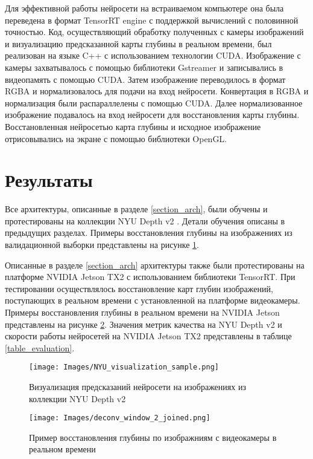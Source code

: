 \documentclass{mipt-thesis-bs}
\begin{document}
Для эффективной работы нейросети на встраиваемом компьютере она была переведена в формат TensorRT engine с поддержкой вычислений с половинной точностью. Код, осуществляющий обработку полученных с камеры изображений и визуализацию предсказанной карты глубины в реальном времени, был реализован на языке C++ с использованием технологии CUDA. Изображение с камеры захватывалось с помощью библиотеки Gstreamer и записывались в видеопамять с помощью CUDA. Затем изображение переводилось в формат RGBA и нормализовалось для подачи на вход нейросети. Конвертация в RGBA и нормализация были распараллелены с помощью CUDA. Далее нормализованное изображение подавалось на вход нейросети для восстановления карты глубины. Восстановленная нейросетью карта глубины и исходное изображение отрисовывались на экране с помощью библиотеки OpenGL.

\section{Результаты}
Все архитектуры, описанные в разделе \ref{section_arch}, были обучены и протестированы на коллекции NYU Depth v2 \cite{silberman2011indoor}. Детали обучения описаны в предыдущих разделах. Примеры восстановления глубины на изображениях из валидационной выборки представлены на рисунке \ref{figurevisualization}.

Описанные в разделе \ref{section_arch} архитектуры также были протестированы на платформе NVIDIA Jetson TX2 \cite{franklin2017nvidia} с использованием библиотеки TensorRT. При тестировании осуществлялось восстановление карт глубин изображений, поступающих в реальном времени с установленной на платформе видеокамеры. Примеры восстановления глубины в реальном времени на NVIDIA Jetson представлены на рисунке \ref{figurevisualizationrealtime}. Значения метрик качества на NYU Depth v2 и скорости работы нейросетей на NVIDIA Jetson TX2 представлены в таблице \ref{table_evaluation}.

\begin{figure}
	\centering
	\texttt{[image: Images/NYU\_visualization\_sample.png]}
	\caption{Визуализация предсказаний нейросети на изображениях из коллекции NYU Depth v2}
	\label{figurevisualization}
\end{figure}

\begin{figure}
	\centering
	\texttt{[image: Images/deconv\_window\_2\_joined.png]}
	\caption{Пример восстановления глубины по изображниям с видеокамеры в реальном времени}
	\label{figurevisualizationrealtime}
\end{figure}
\end{document}
